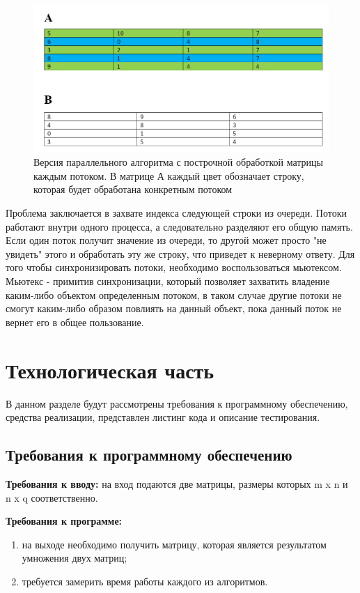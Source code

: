 \documentclass[12pt]{report}
\begin{document}
\begin{figure}[!htbp]
	\centering
	\includegraphics[scale=0.5]{ex_2}
	\caption{Версия параллельного алгоритма с построчной обработкой матрицы каждым потоком. В матрице А каждый цвет обозначает строку, которая будет обработана конкретным потоком}
	\label{fig:mpr}
\end{figure}

\qquad Проблема заключается в захвате индекса следующей строки из очереди. Потоки работают внутри одного процесса, а следовательно разделяют его общую память. Если один поток получит значение из очереди, то другой может просто "не увидеть" этого и обработать эту же строку, что приведет к неверному ответу. Для того чтобы синхронизировать потоки, необходимо воспользоваться мьютексом. Мьютекс - примитив синхронизации, который позволяет захватить владение каким-либо объектом определенным потоком, в таком случае другие потоки не смогут каким-либо образом повлиять на данный объект, пока данный поток не вернет его в общее пользование.\cite{voevodin}

\chapter{Технологическая часть}
В данном разделе будут рассмотрены требования к программному обеспечению, средства реализации, представлен листинг кода и описание тестирования.
\section{Требования к программному обеспечению}
\textbf{Требования к вводу:} на вход подаются две матрицы, размеры которых m x n и n x q соответственно. 

\textbf{Требования к программе:}
\begin{enumerate}
	\item на выходе
	необходимо получить матрицу, которая является результатом умножения двух матриц;
	\item требуется замерить время работы
	каждого из алгоритмов. 
\end{enumerate}
\end{document}
